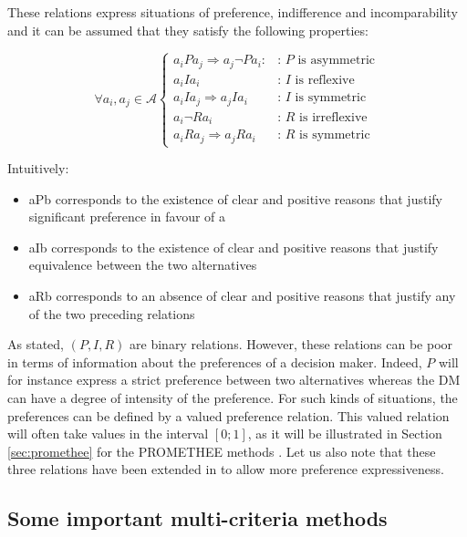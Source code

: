 These relations express situations of preference, indifference and incomparability and it can be assumed that they satisfy the following properties:

\begin{equation}
\forall a_i, a_j \in \mathcal{A} \left\{
	\begin{array}{ll}
	a_iPa_j \Rightarrow a_j \neg P a_i : & \text{: $P$ is asymmetric}\\
	a_iIa_i & \text{: $I$ is reflexive}\\
	a_iIa_j \Rightarrow a_jIa_i & \text{: $I$ is symmetric}\\
	a_i \neg R a_i & \text{: $R$ is irreflexive}\\
	a_iRa_j \Rightarrow a_jRa_i & \text{: $R$ is symmetric}
	\end{array}
\right.
\end{equation}

Intuitively:
\begin{itemize}
\item aPb corresponds to the existence of clear and positive reasons that justify significant preference in favour of a
\item aIb corresponds to the existence of clear and positive reasons that justify equivalence between the two alternatives
\item aRb corresponds to an absence of clear and positive reasons that justify any of the two preceding relations
\end{itemize}

As stated, $(P,I,R)$ are binary relations. However, these relations can be poor in terms of information about the preferences of a decision maker. Indeed, $P$ will for instance express a strict preference between two alternatives whereas the DM can have a degree of intensity of the preference. For such kinds of situations, the preferences can be defined by a valued preference relation. This valued relation will often take values in the interval $[0; 1]$, as it will be illustrated in Section \ref{sec:promethee} for the PROMETHEE methods \cite{EhrgottFigueiraGreco2005}. Let us also note that these three relations have been extended in \cite{tsoukiasvincke97} to allow more preference expressiveness.

\subsection{Some important multi-criteria methods}
\label{subsec:mcdamethods}

